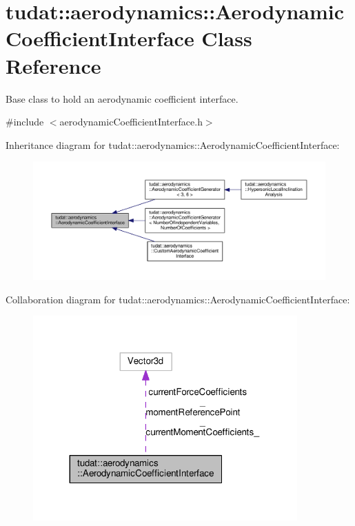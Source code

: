 \hypertarget{classtudat_1_1aerodynamics_1_1AerodynamicCoefficientInterface}{}\section{tudat\+:\+:aerodynamics\+:\+:Aerodynamic\+Coefficient\+Interface Class Reference}
\label{classtudat_1_1aerodynamics_1_1AerodynamicCoefficientInterface}


Base class to hold an aerodynamic coefficient interface.  




{\ttfamily \#include $<$aerodynamic\+Coefficient\+Interface.\+h$>$}



Inheritance diagram for tudat\+:\+:aerodynamics\+:\+:Aerodynamic\+Coefficient\+Interface\+:
\nopagebreak
\begin{figure}[H]
\begin{center}
\leavevmode
\includegraphics[width=350pt]{classtudat_1_1aerodynamics_1_1AerodynamicCoefficientInterface__inherit__graph}
\end{center}
\end{figure}


Collaboration diagram for tudat\+:\+:aerodynamics\+:\+:Aerodynamic\+Coefficient\+Interface\+:
\nopagebreak
\begin{figure}[H]
\begin{center}
\leavevmode
\includegraphics[width=287pt]{classtudat_1_1aerodynamics_1_1AerodynamicCoefficientInterface__coll__graph}
\end{center}
\end{figure}
